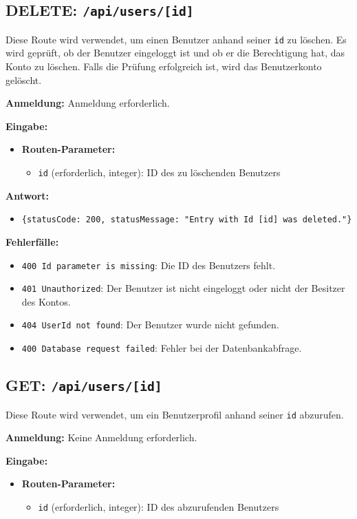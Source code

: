 \documentclass[a4paper,12pt]{article}
\begin{document}
\subsection{DELETE: \texttt{/api/users/[id]}}

Diese Route wird verwendet, um einen Benutzer anhand seiner \texttt{id} zu
löschen. Es wird geprüft, ob der Benutzer eingeloggt ist und ob er die
Berechtigung hat, das Konto zu löschen. Falls die Prüfung erfolgreich ist, wird
das Benutzerkonto gelöscht.

\textbf{Anmeldung:} Anmeldung erforderlich.

\textbf{Eingabe:}
\begin{itemize}
    \item \textbf{Routen-Parameter:}
    \begin{itemize}
        \item \texttt{id} (erforderlich, integer):
            ID des zu löschenden Benutzers
    \end{itemize}
\end{itemize}

\textbf{Antwort:}
\begin{itemize}
    \item \texttt{\{statusCode: 200,
        statusMessage: "Entry with Id [id] was deleted."\}}
\end{itemize}

\textbf{Fehlerfälle:}
\begin{itemize}
    \item \texttt{400 Id parameter is missing}:
        Die ID des Benutzers fehlt.
    \item \texttt{401 Unauthorized}:
        Der Benutzer ist nicht eingeloggt oder nicht der Besitzer des Kontos.
    \item \texttt{404 UserId not found}:
        Der Benutzer wurde nicht gefunden.
    \item \texttt{400 Database request failed}:
        Fehler bei der Datenbankabfrage.
\end{itemize}

\subsection{GET: \texttt{/api/users/[id]}}

Diese Route wird verwendet, um ein Benutzerprofil anhand seiner \texttt{id}
abzurufen.

\textbf{Anmeldung:} Keine Anmeldung erforderlich.

\textbf{Eingabe:}
\begin{itemize}
    \item \textbf{Routen-Parameter:}
    \begin{itemize}
        \item \texttt{id} (erforderlich, integer):
            ID des abzurufenden Benutzers
    \end{itemize}
\end{itemize}
\end{document}

